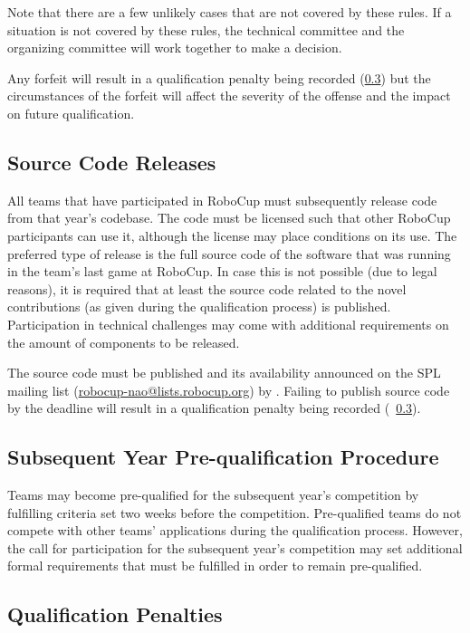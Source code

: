 Note that there are a few unlikely cases that are not covered by these rules.
If a situation is not covered by these rules, the technical committee and the organizing committee will work together to make a decision.

Any forfeit will result in a qualification penalty being recorded (\cf \cref{sec:qualificationPenalties}) but the circumstances of the forfeit will affect the severity of the offense and the impact on future qualification.

\subsection{Source Code Releases}
\label{sec:source_code_releases}

All teams that have participated in RoboCup must subsequently release code from that year's codebase.
The code must be licensed such that other RoboCup participants can use it, although the license may place conditions on its use.
The preferred type of release is the full source code of the software that was running in the team's last game at RoboCup.
In case this is not possible (\eg due to legal reasons), it is required that at least the source code related to the novel contributions (as given during the qualification process) is published.
Participation in technical challenges may come with additional requirements on the amount of components to be released.

The source code must be published and its availability announced on the SPL mailing list (\url{robocup-nao@lists.robocup.org}) by \DTMdate{\CodeReleaseAnnouncementDate}.
Failing to publish source code by the deadline will result in a qualification penalty being recorded (\cf~\cref{sec:qualificationPenalties}).

\subsection{Subsequent Year Pre-qualification Procedure}
\label{sec:preQual}

Teams may become pre-qualified for the subsequent year's competition by fulfilling criteria set two weeks before the competition.
Pre-qualified teams do not compete with other teams' applications during the qualification process.
However, the call for participation for the subsequent year's competition may set additional formal requirements that must be fulfilled in order to remain pre-qualified.

\subsection{Qualification Penalties}
\label{sec:qualificationPenalties}

